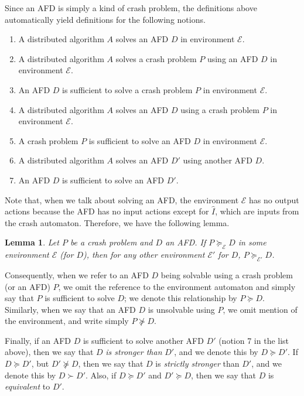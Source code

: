 \documentclass[11pt]{article}
\numberwithin{theorem}{section}
\newtheorem{lemma}[theorem]{Lemma}
\newcommand{\stronger}{\succeq}
\newcommand{\FD}{D}
\begin{document}
Since an AFD is simply a kind of crash problem, the definitions above
automatically yield definitions for the following notions.
\begin{enumerate}
\item 
A distributed algorithm $A$ solves an AFD $\FD$ in environment $\mathcal{E}$.
\item 
A distributed algorithm $A$ solves a crash problem $P$ using an AFD
$\FD$ in environment $\mathcal{E}$.
\item 
An AFD $\FD$ is sufficient to solve a crash problem $P$ in environment
$\mathcal{E}$.
\item 
A distributed algorithm $A$ solves an AFD $\FD$ using a crash problem
$P$ in environment $\mathcal{E}$.
\item 
A crash problem $P$ is sufficient to solve an AFD $\FD$ in environment
$\mathcal{E}$.
\item 
A distributed algorithm $A$ solves an AFD $\FD'$ using another AFD
$\FD$.
\item 
An AFD $\FD$ is sufficient to solve an AFD $\FD'$.
\end{enumerate}

Note that, when we talk about solving an AFD, the environment
$\mathcal{E}$ has no output actions because the AFD has no input
actions except for $\hat{I}$, which are inputs from the crash
automaton. 
Therefore, we have the following lemma.

\begin{lemma}
Let $P$ be a crash problem and $\FD$ an AFD.
If $P \stronger_\mathcal{E} \FD$ in some environment $\mathcal{E}$
(for $\FD$), then for any other environment $\mathcal{E}'$ for $\FD$,
$P \stronger_{\mathcal{E}'} \FD$. 
\end{lemma}

Consequently, when we refer to an AFD $D$ being solvable using a crash
problem (or an AFD) $P$, we omit the reference to the environment
automaton and simply say that $P$ is sufficient to solve $\FD$; we
denote this relationship by $P \stronger \FD$. 
Similarly, when we say that an AFD $\FD$ is unsolvable using $P$, we
omit mention of the environment, and write simply $P \not \stronger \FD$.

Finally, if an AFD $\FD$ is sufficient to solve another AFD $\FD'$ (notion 7 in the list above), then
we say that $\FD$ \emph{is stronger than} $\FD'$, and we denote this
by $\FD \stronger \FD'$. 
If $\FD \stronger \FD'$, but $\FD' \not\stronger \FD$, then we
say that $\FD$ is \emph{strictly stronger} than $\FD'$, and we denote this
by $\FD \succ \FD'$. Also, if  $D \stronger D'$ and $D' \stronger D$, then we say that $D$ is \emph{equivalent} to $D'$.
\end{document}
